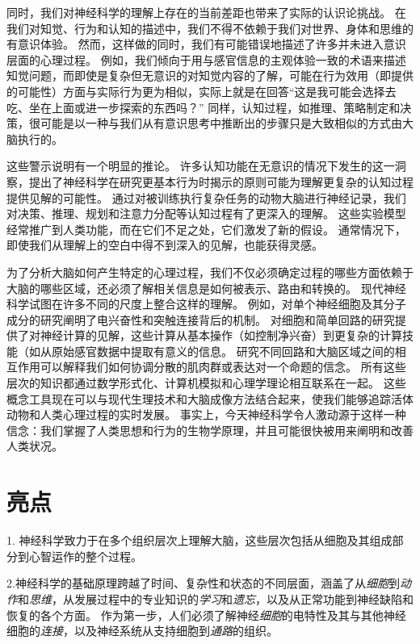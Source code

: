 同时，我们对神经科学的理解上存在的当前差距也带来了实际的认识论挑战。
在我们对知觉、行为和认知的描述中，我们不得不依赖于我们对世界、身体和思维的有意识体验。
然而，这样做的同时，我们有可能错误地描述了许多并未进入意识层面的心理过程。
例如，我们倾向于用与感官信息的主观体验一致的术语来描述知觉问题，而即使是复杂但无意识的对知觉内容的了解，可能在行为效用（即提供的可能性）方面与实际行为更为相似，实际上就是在回答“这是我可能会选择去吃、坐在上面或进一步探索的东西吗？”
同样，认知过程，如推理、策略制定和决策，很可能是以一种与我们从有意识思考中推断出的步骤只是大致相似的方式由大脑执行的。





这些警示说明有一个明显的推论。
许多认知功能在无意识的情况下发生的这一洞察，提出了神经科学在研究更基本行为时揭示的原则可能为理解更复杂的认知过程提供见解的可能性。
通过对被训练执行复杂任务的动物大脑进行神经记录，我们对决策、推理、规划和注意力分配等认知过程有了更深入的理解。
这些实验模型经常推广到人类功能，而在它们不足之处，它们激发了新的假设。
通常情况下，即使我们从理解上的空白中得不到深入的见解，也能获得灵感。


为了分析大脑如何产生特定的心理过程，我们不仅必须确定过程的哪些方面依赖于大脑的哪些区域，还必须了解相关信息是如何被表示、路由和转换的。
现代神经科学试图在许多不同的尺度上整合这样的理解。
例如，对单个神经细胞及其分子成分的研究阐明了电兴奋性和突触连接背后的机制。
对细胞和简单回路的研究提供了对神经计算的见解，这些计算从基本操作（如控制净兴奋）到更复杂的计算技能（如从原始感官数据中提取有意义的信息。
研究不同回路和大脑区域之间的相互作用可以解释我们如何协调分散的肌肉群或表达对一个命题的信念。
所有这些层次的知识都通过数学形式化、计算机模拟和心理学理论相互联系在一起。
这些概念工具现在可以与现代生理技术和大脑成像方法结合起来，使我们能够追踪活体动物和人类心理过程的实时发展。
事实上，今天神经科学令人激动源于这样一种信念：我们掌握了人类思想和行为的生物学原理，并且可能很快被用来阐明和改善人类状况。






\section{亮点}

1. 神经科学致力于在多个组织层次上理解大脑，这些层次包括从细胞及其组成部分到心智运作的整个过程。


2.神经科学的基础原理跨越了时间、复杂性和状态的不同层面，涵盖了从\textit{细胞}到\textit{动作}和\textit{思维}，从发展过程中的专业知识的\textit{学习}和\textit{遗忘}，以及从正常功能到神经缺陷和恢复的各个方面。
作为第一步，人们必须了解神经\textit{细胞}的电特性及其与其他神经细胞的\textit{连接}，以及神经系统从支持细胞到\textit{通路}的组织。


